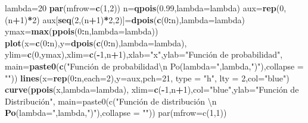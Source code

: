 \documentclass[]{book}
\newenvironment{Shaded}{\begin{snugshade}}{\end{snugshade}}
\newcommand{\CharTok}[1]{\textcolor[rgb]{0.31,0.60,0.02}{#1}}
\newcommand{\DataTypeTok}[1]{\textcolor[rgb]{0.13,0.29,0.53}{#1}}
\newcommand{\DecValTok}[1]{\textcolor[rgb]{0.00,0.00,0.81}{#1}}
\newcommand{\FloatTok}[1]{\textcolor[rgb]{0.00,0.00,0.81}{#1}}
\newcommand{\KeywordTok}[1]{\textcolor[rgb]{0.13,0.29,0.53}{\textbf{#1}}}
\newcommand{\NormalTok}[1]{#1}
\newcommand{\OperatorTok}[1]{\textcolor[rgb]{0.81,0.36,0.00}{\textbf{#1}}}
\newcommand{\StringTok}[1]{\textcolor[rgb]{0.31,0.60,0.02}{#1}}
\begin{document}
\begin{Shaded}
\begin{Highlighting}[]
\NormalTok{lambda=}\DecValTok{20}
\KeywordTok{par}\NormalTok{(}\DataTypeTok{mfrow=}\KeywordTok{c}\NormalTok{(}\DecValTok{1}\NormalTok{,}\DecValTok{2}\NormalTok{))}
\NormalTok{n=}\KeywordTok{qpois}\NormalTok{(}\FloatTok{0.99}\NormalTok{,}\DataTypeTok{lambda=}\NormalTok{lambda)}
\NormalTok{aux=}\KeywordTok{rep}\NormalTok{(}\DecValTok{0}\NormalTok{,(n}\OperatorTok{+}\DecValTok{1}\NormalTok{)}\OperatorTok{*}\DecValTok{2}\NormalTok{)}
\NormalTok{aux[}\KeywordTok{seq}\NormalTok{(}\DecValTok{2}\NormalTok{,(n}\OperatorTok{+}\DecValTok{1}\NormalTok{)}\OperatorTok{*}\DecValTok{2}\NormalTok{,}\DecValTok{2}\NormalTok{)]=}\KeywordTok{dpois}\NormalTok{(}\KeywordTok{c}\NormalTok{(}\DecValTok{0}\OperatorTok{:}\NormalTok{n),}\DataTypeTok{lambda=}\NormalTok{lambda)}
\NormalTok{ymax=}\KeywordTok{max}\NormalTok{(}\KeywordTok{ppois}\NormalTok{(}\DecValTok{0}\OperatorTok{:}\NormalTok{n,}\DataTypeTok{lambda=}\NormalTok{lambda))}
\KeywordTok{plot}\NormalTok{(}\DataTypeTok{x=}\KeywordTok{c}\NormalTok{(}\DecValTok{0}\OperatorTok{:}\NormalTok{n),}\DataTypeTok{y=}\KeywordTok{dpois}\NormalTok{(}\KeywordTok{c}\NormalTok{(}\DecValTok{0}\OperatorTok{:}\NormalTok{n),}\DataTypeTok{lambda=}\NormalTok{lambda),}
     \DataTypeTok{ylim=}\KeywordTok{c}\NormalTok{(}\DecValTok{0}\NormalTok{,ymax),}\DataTypeTok{xlim=}\KeywordTok{c}\NormalTok{(}\OperatorTok{-}\DecValTok{1}\NormalTok{,n}\OperatorTok{+}\DecValTok{1}\NormalTok{),}\DataTypeTok{xlab=}\StringTok{"x"}\NormalTok{,}\DataTypeTok{ylab=}\StringTok{"Función de probabilidad"}\NormalTok{,}
     \DataTypeTok{main=}\KeywordTok{paste0}\NormalTok{(}\KeywordTok{c}\NormalTok{(}\StringTok{"Función de probabilidad}\CharTok{\textbackslash{}n}\StringTok{  Po(lambda="}\NormalTok{,lambda,}\StringTok{")"}\NormalTok{),}\DataTypeTok{collapse =} \StringTok{""}\NormalTok{))}
\KeywordTok{lines}\NormalTok{(}\DataTypeTok{x=}\KeywordTok{rep}\NormalTok{(}\DecValTok{0}\OperatorTok{:}\NormalTok{n,}\DataTypeTok{each=}\DecValTok{2}\NormalTok{),}\DataTypeTok{y=}\NormalTok{aux,}\DataTypeTok{pch=}\DecValTok{21}\NormalTok{, }\DataTypeTok{type =} \StringTok{"h"}\NormalTok{, }\DataTypeTok{lty =} \DecValTok{2}\NormalTok{,}\DataTypeTok{col=}\StringTok{"blue"}\NormalTok{)}
\KeywordTok{curve}\NormalTok{(}\KeywordTok{ppois}\NormalTok{(x,}\DataTypeTok{lambda=}\NormalTok{lambda),}
      \DataTypeTok{xlim=}\KeywordTok{c}\NormalTok{(}\OperatorTok{-}\DecValTok{1}\NormalTok{,n}\OperatorTok{+}\DecValTok{1}\NormalTok{),}\DataTypeTok{col=}\StringTok{"blue"}\NormalTok{,}\DataTypeTok{ylab=}\StringTok{"Función de Distribución",}
\StringTok{      main=paste0(c("}\NormalTok{Función de distribución \textbackslash{}n }\KeywordTok{Po}\NormalTok{(}\DataTypeTok{lambda=}\StringTok{",lambda,"}\NormalTok{)}\StringTok{"),collapse = ""))}
\StringTok{par(mfrow=c(1,1))}
\end{Highlighting}
\end{Shaded}
\end{document}
